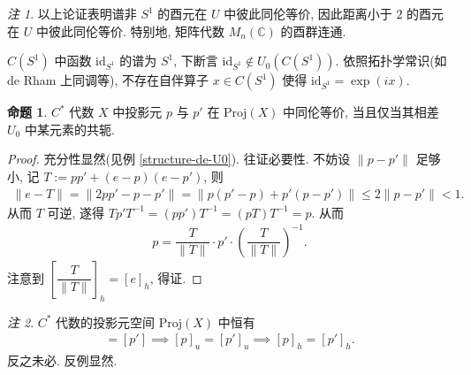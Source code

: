 \documentclass{MainStyle}
\theoremstyle{definition}
\theoremstyle{definition}
\theoremstyle{definition}
\theoremstyle{definition}
\newtheorem{proposition}{命题}
\theoremstyle{definition}
\theoremstyle{definition}
\theoremstyle{definition}
\theoremstyle{remark}
\newtheorem{remark}{注}
\theoremstyle{remark}
\begin{document}
\begin{remark}
    以上论证表明谱非 $S^1$ 的酉元在 $U$ 中彼此同伦等价, 因此距离小于 $2$ 的酉元在 $U$ 中彼此同伦等价. 特别地, 矩阵代数 $M_n(\mathbb C)$ 的酉群连通. \par
    $C(S^1)$ 中函数 $\mathrm{id}_{S^1}$ 的谱为 $S^1$, 下断言 $\mathrm{id}_{S^1}\notin U_0(C(S^1))$. 依照拓扑学常识(如 de Rham 上同调等), 不存在自伴算子 $x\in C(S^1)$ 使得 $\mathrm{id}_{S^1}=\exp(ix)$.
\end{remark}

\begin{proposition}
    $C^\ast$ 代数 $X$ 中投影元 $p$ 与 $p'$ 在 $\mathrm{Proj}(X)$ 中同伦等价, 当且仅当其相差 $U_0$ 中某元素的共轭.
    \begin{proof}
        充分性显然(见例 \ref{structure-de-U0}). 往证必要性. 不妨设 $\|p-p'\|$ 足够小, 记 $T:=pp'+(e-p)(e-p')$, 则
        \begin{align*}
            \|e-T\|=\|2pp'-p-p'\|=\|p(p'-p)+p'(p-p')\|\leq 2\|p-p'\|< 1.
        \end{align*}
        从而 $T$ 可逆, 遂得 $Tp'T^{-1}=(pp')T^{-1}=(pT)T^{-1}=p$. 从而
        \begin{align*}
            p=\dfrac{T}{\|T\|}\cdot p'\cdot \left(\dfrac{T}{\|T\|}\right)^{-1}.
        \end{align*}
        注意到 $\left[\dfrac{T}{\|T\|}\right]_h=[e]_h$, 得证.
    \end{proof}
\end{proposition}

\begin{remark}
    $C^\ast$ 代数的投影元空间 $\mathrm{Proj}(X)$ 中恒有
    \begin{align*}
        [p]=[p']\implies [p]_u=[p']_u\implies [p]_h=[p']_h.
    \end{align*}
    反之未必. 反例显然.
\end{remark}
\end{document}
